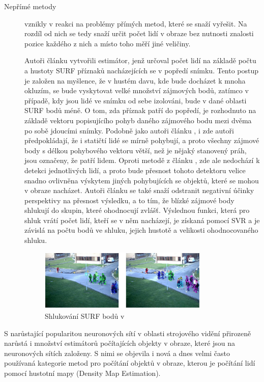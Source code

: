 \begin{description}
\item[Nepřímé metody] vznikly v reakci na problémy přímých metod, které se snaží vyřešit.
Na rozdíl od nich se tedy snaží určit počet lidí v obraze bez nutnosti znalosti pozice každého z nich a místo toho měří jiné veličiny.

Autoři článku \cite{crowd_on_pets} vytvořili estimátor, jenž určoval počet lidí na základě počtu a hustoty SURF příznaků nacházejících se v popředí snímku.
Tento postup je založen na myšlence, že v hustém davu, kde bude docházet k mnoha okluzím, se bude vyskytovat velké množství zájmových bodů, zatímco v případě, kdy jsou lidé ve snímku od sebe izolováni, bude v dané oblasti SURF bodů méně.
O tom, zda příznak patří do popředí, je rozhodnuto na základě vektoru popisujícího pohyb daného zájmového bodu mezi dvěma po sobě jdoucími snímky.
Podobně jako autoři článku \cite{head_and_shoulders}, i zde autoři předpokládají, že i statičtí lidé se mírně pohybují, a proto všechny zájmové body s délkou pohybového vektoru větší, než je nějaký stanovený práh, jsou označeny, že patří lidem.
Oproti metodě z článku \cite{head_and_shoulders}, zde ale nedochází k detekci jednotlivých lidí, a proto bude přesnost tohoto detektoru velice snadno ovlivněna výskytem jiných pohybujících se objektů, které se mohou v obraze nacházet.
Autoři článku se také snaží odstranit negativní účinky perspektivy na přesnost výsledku, a to tím, že blízké zájmové body shlukují do skupin, které ohodnocují zvlášť.
Výslednou funkci, která pro shluk vrátí počet lidí, kteří se v něm nacházejí, je získaná pomocí SVR a je závislá na počtu bodů ve shluku, jejich hustotě a velikosti ohodnocovaného shluku.

\begin{figure}[h!]
	\centering
	\includegraphics[width=0.8\textwidth]{Figures/history/PETS_CLUSTERS.png}
	\caption{Shlukování SURF bodů v \cite{crowd_on_pets}}
	\label{fig:PETS}
\end{figure}

\end{description}


S narůstající popularitou neuronových sítí v oblasti strojového vidění přirozeně narůstá i množství estimátorů počítajících objekty v obraze, které jsou na neuronových sítích založeny.
S nimi se objevila i nová a dnes velmi často používaná kategorie metod pro počítání objektů v obraze, kterou je počítání lidí pomocí hustotní mapy (Density Map Estimation).

